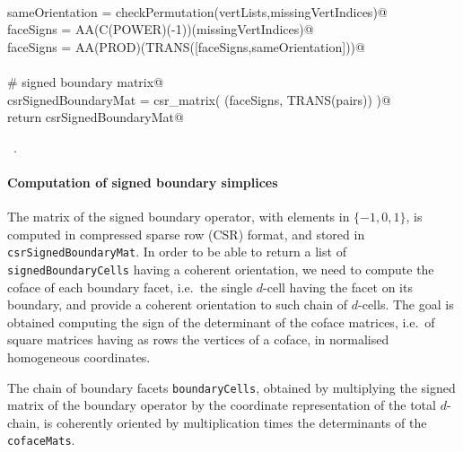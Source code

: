 \documentclass[11pt,oneside]{article}    %
\begin{document}
\begin{flushleft}
\begin{list}{}{}
\mbox{}\verb@@\\
\mbox{}\verb@    sameOrientation = checkPermutation(vertLists,missingVertIndices)@\\
\mbox{}\verb@    faceSigns = AA(C(POWER)(-1))(missingVertIndices)@\\
\mbox{}\verb@    faceSigns = AA(PROD)(TRANS([faceSigns,sameOrientation]))@\\
\mbox{}\verb@@\\
\mbox{}\verb@    # signed boundary matrix@\\
\mbox{}\verb@    csrSignedBoundaryMat = csr_matrix( (faceSigns, TRANS(pairs)) )@\\
\mbox{}\verb@    return csrSignedBoundaryMat@\\
\mbox{}\verb@@{\NWsep}
\end{list}
\vspace{-1ex}
\footnotesize\addtolength{\baselineskip}{-1ex}
\begin{list}{}{\setlength{\itemsep}{-\parsep}\setlength{\itemindent}{-\leftmargin}}
\item \NWtxtMacroRefIn\ .
\end{list}
\end{flushleft}

\paragraph{Computation of signed boundary simplices}

The matrix of the signed boundary operator, with elements in $\{-1,0,1\}$, is computed in compressed sparse row (CSR) format, and stored in \texttt{csrSignedBoundaryMat}. In order to be able to return a list of \texttt{signedBoundaryCells} having a coherent orientation, we need to compute the coface of each boundary facet, i.e.~the single $d$-cell having the facet on its boundary, and provide a coherent orientation to such chain of $d$-cells. The goal is obtained computing the sign of the determinant of the coface matrices, i.e.~of square matrices having as rows the vertices of a coface, in normalised homogeneous coordinates.

The chain of boundary facets \texttt{boundaryCells}, obtained by multiplying the signed matrix of the boundary operator by the coordinate representation of the total $d$-chain, is coherently oriented by multiplication times the determinants of the \texttt{cofaceMats}.
\end{document}
